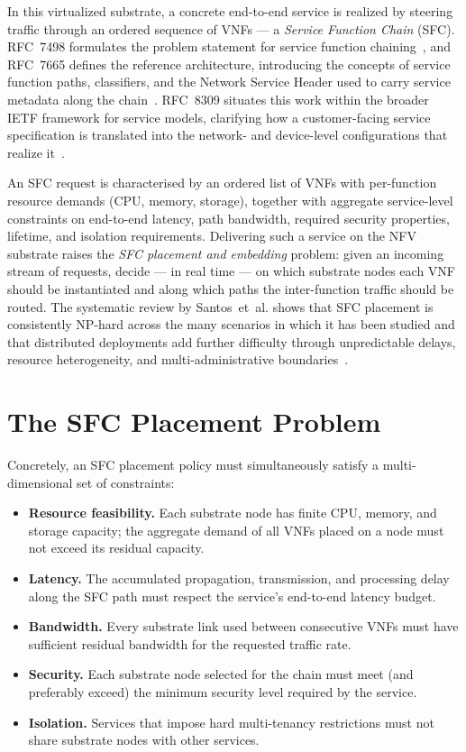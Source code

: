 In this virtualized substrate, a concrete end-to-end service is
realized by steering traffic through an ordered sequence of VNFs ---
a \textit{Service Function Chain} (SFC). RFC~7498 formulates the
problem statement for service function
chaining~\cite{p_quinn_problem_2015}, and RFC~7665 defines the
reference architecture, introducing the concepts of service function
paths, classifiers, and the Network Service Header used to carry
service metadata along the
chain~\cite{halpern_service_2015}. RFC~8309 situates this work within
the broader IETF framework for service models, clarifying how a
customer-facing service specification is translated into the
network- and device-level configurations that realize
it~\cite{wu_service_2018}.

An SFC request is characterised by an ordered list of VNFs with
per-function resource demands (CPU, memory, storage), together with
aggregate service-level constraints on end-to-end latency, path
bandwidth, required security properties, lifetime, and isolation
requirements. Delivering such a service on the NFV substrate raises
the \textit{SFC placement and embedding} problem: given an incoming
stream of requests, decide --- in real time --- on which substrate
nodes each VNF should be instantiated and along which paths the
inter-function traffic should be routed. The systematic review by
Santos~et~al. shows that SFC placement is consistently NP-hard across
the many scenarios in which it has been studied and that distributed
deployments add further difficulty through unpredictable delays,
resource heterogeneity, and multi-administrative
boundaries~\cite{santos_service_2021}.

\section{The SFC Placement Problem}

Concretely, an SFC placement policy must simultaneously satisfy a
multi-dimensional set of constraints:

\begin{itemize}
  \item \textbf{Resource feasibility.} Each substrate node has finite
  CPU, memory, and storage capacity; the aggregate demand of all VNFs
  placed on a node must not exceed its residual capacity.
  \item \textbf{Latency.} The accumulated propagation, transmission,
  and processing delay along the SFC path must respect the service's
  end-to-end latency budget.
  \item \textbf{Bandwidth.} Every substrate link used between
  consecutive VNFs must have sufficient residual bandwidth for the
  requested traffic rate.
  \item \textbf{Security.} Each substrate node selected for the chain
  must meet (and preferably exceed) the minimum security level
  required by the service.
  \item \textbf{Isolation.} Services that impose hard
  multi-tenancy restrictions must not share substrate nodes with
  other services.
\end{itemize}

